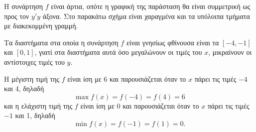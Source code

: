 \begin{alist}
\item Η συνάρτηση $f$ είναι άρτια, οπότε η γραφική της παράσταση θα είναι συμμετρική ως προς τον $y'y$ άξονα. Στο παρακάτω σχήμα είναι χαραγμένα και τα υπόλοιπα τμήματα με διακεκομμένη γραμμή.
\begin{center}
\end{center}
\item
\begin{rlist}
\item Τα διαστήματα στα οποία η συνάρτηση $f$ είναι γνησίως φθίνουσα είναι τα $[-4, -1]$ και $[0, 1]$, γιατί στα διαστήματα αυτά όσο μεγαλώνουν οι τιμές του $x$, μικραίνουν οι αντίστοιχες τιμές του $y$.
\item Η μέγιστη τιμή της $f$ είναι ίση με 6 και παρουσιάζεται όταν το $x$ πάρει τις τιμές $-4$ και 4, δηλαδή
\[\max f(x) = f(-4) = f(4) = 6\]
και η ελάχιστη τιμή της $f$ είναι ίση με 0 και παρουσιάζεται όταν το $x$ πάρει τις τιμές $-1$ και 1, δηλαδή
\[\min f(x) = f(-1) = f(1) = 0.\]
\end{rlist}
\end{alist}

